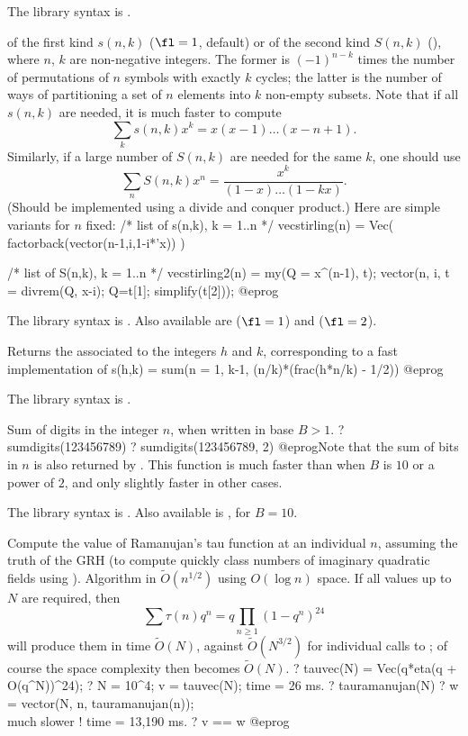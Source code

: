 The library syntax is .

\label{se:stirling}
 of the first kind $s(n,k)$ ($\fl=1$, default) or
of the second kind $S(n,k)$ (), where $n$, $k$ are non-negative
integers. The former is $(-1)^{n-k}$ times the
number of permutations of $n$ symbols with exactly $k$ cycles; the latter is
the number of ways of partitioning a set of $n$ elements into $k$ non-empty
subsets. Note that if all $s(n,k)$ are needed, it is much faster to compute
$$\sum_k s(n,k) x^k = x(x-1)\dots(x-n+1).$$
Similarly, if a large number of $S(n,k)$ are needed for the same $k$,
one should use
$$\sum_n S(n,k) x^n = \dfrac{x^k}{(1-x)\dots(1-kx)}.$$
(Should be implemented using a divide and conquer product.) Here are
simple variants for $n$ fixed:
\bprog
/* list of s(n,k), k = 1..n */
vecstirling(n) = Vec( factorback(vector(n-1,i,1-i*'x)) )

/* list of S(n,k), k = 1..n */
vecstirling2(n) =
{ my(Q = x^(n-1), t);
  vector(n, i, t = divrem(Q, x-i); Q=t[1]; simplify(t[2]));
}
@eprog

The library syntax is .
Also available are 
($\fl=1$) and  ($\fl=2$).

\label{se:sumdedekind}
Returns the  associated to the integers $h$ and $k$,
 corresponding to a fast implementation of
 \bprog
  s(h,k) = sum(n = 1, k-1, (n/k)*(frac(h*n/k) - 1/2))
 @eprog

The library syntax is .

\label{se:sumdigits}
Sum of digits in the integer $n$, when written in base $B > 1$.
\bprog
? sumdigits(123456789)
? sumdigits(123456789, 2)
@eprog\noindent Note that the sum of bits in $n$ is also returned by
. This function is much faster than
 when $B$ is $10$ or a power of $2$, and only
slightly faster in other cases.

The library syntax is .
Also available is , for $B = 10$.

\label{se:tauramanujan}
Compute the value of Ramanujan's tau function at an individual $n$,
assuming the truth of the GRH (to compute quickly class numbers of imaginary
quadratic fields using ).
Algorithm in $\tilde{O}(n^{1/2})$ using $O(\log n)$ space. If all values up
to $N$ are required, then
$$\sum \tau(n)q^n = q \prod_{n\geq 1} (1-q^n)^{24}$$
will produce them in time $\tilde{O}(N)$, against $\tilde{O}(N^{3/2})$ for
individual calls to ; of course the space complexity then
becomes $\tilde{O}(N)$.
\bprog
? tauvec(N) = Vec(q*eta(q + O(q^N))^24);
? N = 10^4; v = tauvec(N);
time = 26 ms.
? tauramanujan(N)
? w = vector(N, n, tauramanujan(n)); \\ much slower !
time = 13,190 ms.
? v == w
@eprog

